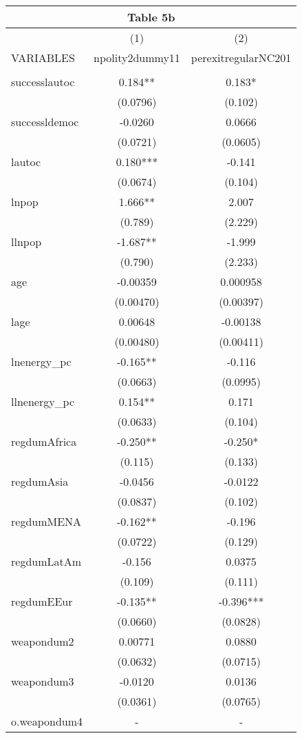 \documentclass[]{article}
\begin{document}
\begin{tabular}{lcc}
\multicolumn{3}{c}{Table 5b} \\ \hline
 & (1) & (2) \\
VARIABLES & npolity2dummy11 & perexitregularNC201 \\ \hline
 &  &  \\
successlautoc & 0.184** & 0.183* \\
 & (0.0796) & (0.102) \\
successldemoc & -0.0260 & 0.0666 \\
 & (0.0721) & (0.0605) \\
lautoc & 0.180*** & -0.141 \\
 & (0.0674) & (0.104) \\
lnpop & 1.666** & 2.007 \\
 & (0.789) & (2.229) \\
llnpop & -1.687** & -1.999 \\
 & (0.790) & (2.233) \\
age & -0.00359 & 0.000958 \\
 & (0.00470) & (0.00397) \\
lage & 0.00648 & -0.00138 \\
 & (0.00480) & (0.00411) \\
lnenergy\_pc & -0.165** & -0.116 \\
 & (0.0663) & (0.0995) \\
llnenergy\_pc & 0.154** & 0.171 \\
 & (0.0633) & (0.104) \\
regdumAfrica & -0.250** & -0.250* \\
 & (0.115) & (0.133) \\
regdumAsia & -0.0456 & -0.0122 \\
 & (0.0837) & (0.102) \\
regdumMENA & -0.162** & -0.196 \\
 & (0.0722) & (0.129) \\
regdumLatAm & -0.156 & 0.0375 \\
 & (0.109) & (0.111) \\
regdumEEur & -0.135** & -0.396*** \\
 & (0.0660) & (0.0828) \\
weapondum2 & 0.00771 & 0.0880 \\
 & (0.0632) & (0.0715) \\
weapondum3 & -0.0120 & 0.0136 \\
 & (0.0361) & (0.0765) \\
o.weapondum4 & - & - \\

\end{tabular}
\end{document}
